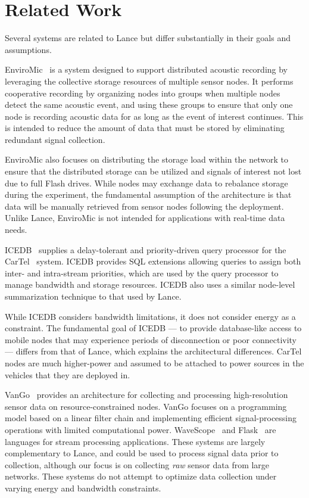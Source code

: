 \section{Related Work}
\label{lance-sec-related}

Several systems are related to Lance but differ substantially in their goals
and assumptions.

EnviroMic~\cite{enviromic} is a system designed to support distributed
acoustic recording by leveraging the collective storage resources of multiple
sensor nodes. It performs cooperative recording by organizing nodes into
groups when multiple nodes detect the same acoustic event, and using these
groups to ensure that only one node is recording acoustic data for as long as
the event of interest continues. This is intended to reduce the amount of
data that must be stored by eliminating redundant signal collection.

EnviroMic also focuses on distributing the storage load within the network to
ensure that the distributed storage can be utilized and signals of interest
not lost due to full Flash drives. While nodes may exchange data to rebalance
storage during the experiment, the fundamental assumption of the architecture
is that data will be manually retrieved from sensor nodes following the
deployment. Unlike Lance, EnviroMic is not intended for applications with
real-time data needs.

ICEDB~\cite{zhang2007icedb} supplies a delay-tolerant and priority-driven
query processor for the CarTel~\cite{cartel} system. ICEDB provides SQL
extensions allowing queries to assign both inter- and intra-stream
priorities, which are used by the query processor to manage bandwidth and
storage resources. ICEDB also uses a similar node-level summarization
technique to that used by Lance.

While ICEDB considers bandwidth limitations, it does not consider energy as a
constraint. The fundamental goal of ICEDB --- to provide database-like access
to mobile nodes that may experience periods of disconnection or poor
connectivity --- differs from that of Lance, which explains the architectural
differences. CarTel nodes are much higher-power and assumed to be attached to
power sources in the vehicles that they are deployed in.

VanGo~\cite{vango} provides an architecture for collecting and processing
high-resolution sensor data on resource-constrained nodes. VanGo focuses on a
programming model based on a linear filter chain and implementing efficient
signal-processing operations with limited computational power.
WaveScope~\cite{wavescope} and Flask~\cite{flask-tr} are languages for stream
processing applications. These systems are largely complementary to Lance,
and could be used to process signal data prior to collection, although our
focus is on collecting \textit{raw} sensor data from large networks. These
systems do not attempt to optimize data collection under varying energy and
bandwidth constraints. 

